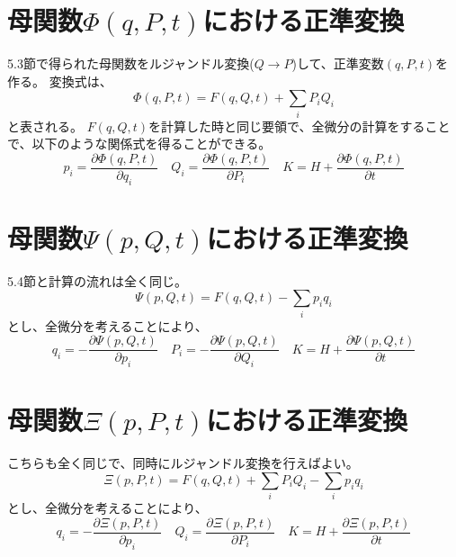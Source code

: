 \documentclass[a4paper]{jsreport}
\begin{document}
        \section{母関数$\Phi(q, P, t)$における正準変換}
            5.3節で得られた母関数をルジャンドル変換($Q \to P$)して、正準変数$(q, P, t)$を作る。
            変換式は、
            \begin{equation}
                \Phi(q, P, t) = F(q, Q, t) + \sum_{i} P_i Q_i
            \end{equation}
            と表される。
            $F(q, Q, t)$を計算した時と同じ要領で、全微分の計算をすることで、以下のような関係式を得ることができる。
            \begin{equation} \label{eq:5b}
                p_i = \frac{\partial \Phi(q, P, t)}{\partial q_i} \quad Q_i = \frac{\partial \Phi(q, P, t)}{\partial P_i} \quad K = H + \frac{\partial \Phi(q, P, t)}{\partial t}
            \end{equation}

        \section{母関数$\Psi(p, Q, t)$における正準変換}
            5.4節と計算の流れは全く同じ。
            \begin{equation}
                \Psi(p, Q, t) = F(q, Q, t) - \sum_{i} p_i q_i
            \end{equation}
            とし、全微分を考えることにより、
            \begin{equation} \label{eq:5c}
                q_i = - \frac{\partial \Psi(p, Q, t)}{\partial p_i} \quad P_i = - \frac{\partial \Psi(p, Q, t)}{\partial Q_i} \quad K = H + \frac{\partial \Psi(p, Q, t)}{\partial t}
            \end{equation}

        \section{母関数$\Xi(p, P, t)$における正準変換}
            こちらも全く同じで、同時にルジャンドル変換を行えばよい。
            \begin{equation}
                \Xi(p, P, t) = F(q, Q, t) + \sum_{i} P_i Q_i - \sum_{i} p_i q_i
            \end{equation}
            とし、全微分を考えることにより、
            \begin{equation} \label{eq:5d}
                q_i = - \frac{\partial \Xi(p, P, t)}{\partial p_i} \quad Q_i = \frac{\partial \Xi(p, P, t)}{\partial P_i} \quad K = H + \frac{\partial \Xi(p, P, t)}{\partial t}
            \end{equation}
        
\end{document}

